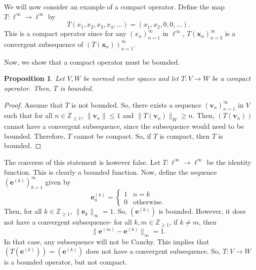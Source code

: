 \documentclass[a4paper, openany]{memoir}
\theoremstyle{definition}
\theoremstyle{plain}
\newtheorem{proposition}[definition]{Proposition}
\begin{document}
    We will now consider an example of a compact operator. Define the map $T: \ell^\infty \to \ell^\infty$ by
    \[T(x_1, x_2, x_3, x_4, \dots) = (x_1, x_2, 0, 0, \dots).\]
    This is a compact operator since for any $(x_n)_{n=1}^\infty$ in $\ell^\infty$, $T(\bm{x}_n)_{n=3}^\infty$ is a convergent subsequence of $(T(\bm{x}_n))_{n=1}^\infty$.

    Now, we show that a compact operator must be bounded.
    \begin{proposition}
        Let $V, W$ be normed vector spaces and let $T: V \to W$ be a compact operator. Then, $T$ is bounded.
    \end{proposition}
    \begin{proof}
        Assume that $T$ is not bounded. So, there exists a sequence $(\bm{v}_n)_{n=1}^\infty$ in $V$ such that for all $n \in \mathbb{Z}_{\geq 1}$, $\lVert \bm{v}_n \rVert \leq 1$ and $\lVert T(\bm{v}_n) \rVert_W \geq n$. Then, $(T(\bm{v}_n))$ cannot have a convergent subsequence, since the subsequence would need to be bounded. Therefore, $T$ cannot be compact. So, if $T$ is compact, then $T$ is bounded.
    \end{proof}
    \noindent The converse of this statement is however false. Let $T: \ell^\infty \to \ell^\infty$ be the identity function. This is clearly a bounded function. Now, define the sequence $(\bm{e}^{(k)})_{k=1}^\infty$ given by
    \[\bm{e}^{(k)}_n = \begin{cases}
        1 & n = k \\
        0 & \text{otherwise}.
    \end{cases}\]
    Then, for all $k \in \mathbb{Z}_{\geq 1}$, $\lVert \bm{e}_k \rVert_\infty = 1$. So, $(\bm{e}^{(k)})$ is bounded. However, it does not have a convergent subsequence- for all $k, m \in \mathbb{Z}_{\geq 1}$, if $k \neq m$, then 
    \[\lVert \bm{e}^{(m)} - \bm{e}^{(k)} \rVert_\infty = 1.\]
    In that case, any subsequence will not be Cauchy. This implies that $(T(\bm{e}^{(k)})) = (\bm{e}^{(k)})$ does not have a convergent subsequence. So, $T: V \to W$ is a bounded operator, but not compact.
\end{document}
